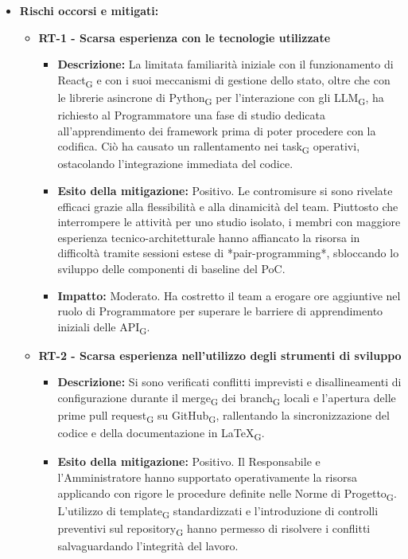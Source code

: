 ﻿\documentclass[a4paper, 10pt, colorlinks=true, linkcolor=black, urlcolor=blue, citecolor=blue, hidelinks]{article}
\begin{document}
\begin{itemize}
    \item \textbf{Rischi occorsi e mitigati:}
    \begin{itemize}
        \item \textbf{RT-1 - Scarsa esperienza con le tecnologie utilizzate}
        \begin{itemize}
            \item \textbf{Descrizione:} La limitata familiarità iniziale con il funzionamento di React\textsubscript{G} e con i suoi meccanismi di gestione dello stato, oltre che con le librerie asincrone di Python\textsubscript{G} per l'interazione con gli LLM\textsubscript{G}, ha richiesto al Programmatore una fase di studio dedicata all'apprendimento dei framework prima di poter procedere con la codifica. Ciò ha causato un rallentamento nei task\textsubscript{G} operativi, ostacolando l'integrazione immediata del codice.
            \item \textbf{Esito della mitigazione:} Positivo. Le contromisure si sono rivelate efficaci grazie alla flessibilità e alla dinamicità del team. Piuttosto che interrompere le attività per uno studio isolato, i membri con maggiore esperienza tecnico-architetturale hanno affiancato la risorsa in difficoltà tramite sessioni estese di *pair-programming*, sbloccando lo sviluppo delle componenti di baseline del PoC.
            \item \textbf{Impatto:} Moderato. Ha costretto il team a erogare ore aggiuntive nel ruolo di Programmatore per superare le barriere di apprendimento iniziali delle API\textsubscript{G}.
        \end{itemize}
        \item \textbf{RT-2 - Scarsa esperienza nell'utilizzo degli strumenti di sviluppo}
        \begin{itemize}
            \item \textbf{Descrizione:} Si sono verificati conflitti imprevisti e disallineamenti di configurazione durante il merge\textsubscript{G} dei branch\textsubscript{G} locali e l'apertura delle prime pull request\textsubscript{G} su GitHub\textsubscript{G}, rallentando la sincronizzazione del codice e della documentazione in LaTeX\textsubscript{G}.
            \item \textbf{Esito della mitigazione:} Positivo. Il Responsabile e l'Amministratore hanno supportato operativamente la risorsa applicando con rigore le procedure definite nelle Norme di Progetto\textsubscript{G}. L'utilizzo di template\textsubscript{G} standardizzati e l'introduzione di controlli preventivi sul repository\textsubscript{G} hanno permesso di risolvere i conflitti salvaguardando l'integrità del lavoro.

\end{itemize}
\end{itemize}
\end{itemize}
\end{document}
